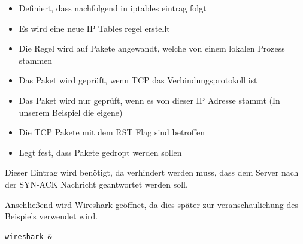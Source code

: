 \begin{itemize}
	\item {} Definiert, dass nachfolgend in iptables eintrag folgt
	\item {} Es wird eine neue IP Tables regel erstellt
	\item {} Die Regel wird auf Pakete angewandt, welche von einem lokalen Prozess stammen
	\item {} Das Paket wird geprüft, wenn TCP das Verbindungsprotokoll ist
	\item {} Das Paket wird nur geprüft, wenn es von dieser IP Adresse stammt (In unserem Beispiel die eigene)
	\item {} Die TCP Pakete mit dem RST Flag sind betroffen
	\item {} Legt fest, dass Pakete gedropt werden sollen
\end{itemize}

Dieser Eintrag wird benötigt, da verhindert werden muss, dass dem Server nach der SYN-ACK Nachricht geantwortet werden soll. 

Anschließend wird Wireshark geöffnet, da dies später zur veranschaulichung des Beispiels verwendet wird.
\begin{lstlisting}
wireshark &
\end{lstlisting}

